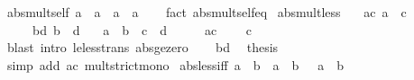 \begin{isabellebody}
\isadelimproof
\isanewline
%
\endisadelimproof
\isanewline
{}\isamarkupfalse%
\ abs{\isacharunderscore}{\kern0pt}mult{\isacharunderscore}{\kern0pt}self{\isacharcolon}{\kern0pt}\ {\isachardoublequoteopen}{\isasymbar}a{\isasymbar}\ {\isacharasterisk}{\kern0pt}\ {\isasymbar}a{\isasymbar}\ {\isacharequal}{\kern0pt}\ a\ {\isacharasterisk}{\kern0pt}\ a{\isachardoublequoteclose}\isanewline
%
\isadelimproof
\ \ %
\endisadelimproof
%
\isatagproof
{}\isamarkupfalse%
\ {\isacharparenleft}{\kern0pt}fact\ abs{\isacharunderscore}{\kern0pt}mult{\isacharunderscore}{\kern0pt}self{\isacharunderscore}{\kern0pt}eq{\isacharparenright}{\kern0pt}%
\endisatagproof
{\isafoldproof}%
%
\isadelimproof
\isanewline
%
\endisadelimproof
\isanewline
{}\isamarkupfalse%
\ abs{\isacharunderscore}{\kern0pt}mult{\isacharunderscore}{\kern0pt}less{\isacharcolon}{\kern0pt}\isanewline
\ \ \ ac{\isacharcolon}{\kern0pt}\ {\isachardoublequoteopen}{\isasymbar}a{\isasymbar}\ {\isacharless}{\kern0pt}\ c{\isachardoublequoteclose}\isanewline
\ \ \ \ \ bd{\isacharcolon}{\kern0pt}\ {\isachardoublequoteopen}{\isasymbar}b{\isasymbar}\ {\isacharless}{\kern0pt}\ d{\isachardoublequoteclose}\isanewline
\ \ \ {\isachardoublequoteopen}{\isasymbar}a{\isasymbar}\ {\isacharasterisk}{\kern0pt}\ {\isasymbar}b{\isasymbar}\ {\isacharless}{\kern0pt}\ c\ {\isacharasterisk}{\kern0pt}\ d{\isachardoublequoteclose}\isanewline
%
\isadelimproof
%
\endisadelimproof
%
\isatagproof
{}\isamarkupfalse%
\ {\isacharminus}{\kern0pt}\isanewline
\ \ \isamarkupfalse%
\ ac\ \isamarkupfalse%
\ {\isachardoublequoteopen}{}\ {\isacharless}{\kern0pt}\ c{\isachardoublequoteclose}\isanewline
\ \ \ \ \isamarkupfalse%
\ {\isacharparenleft}{\kern0pt}blast\ intro{\isacharcolon}{\kern0pt}\ le{\isacharunderscore}{\kern0pt}less{\isacharunderscore}{\kern0pt}trans\ abs{\isacharunderscore}{\kern0pt}ge{\isacharunderscore}{\kern0pt}zero{\isacharparenright}{\kern0pt}\isanewline
\ \ \isamarkupfalse%
\ bd\ \isamarkupfalse%
\ {\isacharquery}{\kern0pt}thesis\ \isamarkupfalse%
\ {\isacharparenleft}{\kern0pt}simp\ add{\isacharcolon}{\kern0pt}\ ac\ mult{\isacharunderscore}{\kern0pt}strict{\isacharunderscore}{\kern0pt}mono{\isacharparenright}{\kern0pt}\isanewline
{}\isamarkupfalse%
%
\endisatagproof
{\isafoldproof}%
%
\isadelimproof
\isanewline
%
\endisadelimproof
\isanewline
{}\isamarkupfalse%
\ abs{\isacharunderscore}{\kern0pt}less{\isacharunderscore}{\kern0pt}iff{\isacharcolon}{\kern0pt}\ {\isachardoublequoteopen}{\isasymbar}a{\isasymbar}\ {\isacharless}{\kern0pt}\ b\ {\isasymlongleftrightarrow}\ a\ {\isacharless}{\kern0pt}\ b\ {\isasymand}\ {\isacharminus}{\kern0pt}\ a\ {\isacharless}{\kern0pt}\ b{\isachardoublequoteclose}\isanewline

\end{isabellebody}
